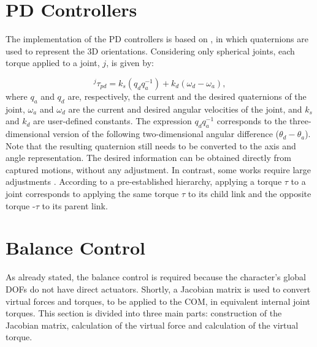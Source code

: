 \documentclass[tog]{acmsiggraph}
\begin{document}

\section{PD Controllers}

The implementation of the PD controllers is based on \cite{bib:NunesTese12}, in which quaternions are used to represent the 3D orientations. 
Considering only spherical joints, each torque applied to a joint, $j$, is given by:

%
\begin{equation}
 ^{j}\tau_{pd} = k_{s}(q_{d}  q_{a}^{-1}) + k_{d}(\omega_{d} -\omega_{a}),
 \label{eq:toquepd3d}
\end{equation}
%
\noindent 
where $q_{a}$ and $q_{d}$ are, respectively, the current and the desired quaternions of the joint, $\omega_{a}$ and $\omega_{d}$ are the current 
and desired angular velocities of the joint, and $k_{s}$ and $k_{d}$ are user-defined constants. The expression  $q_{d}  q_{a}^{-1}$ corresponds to the 
three-dimensional version of the following two-dimensional angular difference ($\theta_d - \theta_a$). Note that the resulting quaternion still
needs to be converted to the axis and angle representation. The desired information can be obtained directly from captured motions, without any
adjustment. In contrast, some works require large adjustments \cite{bib:Yin07}. According to a pre-established hierarchy, applying a torque $\tau$ to a joint corresponds
to applying the same torque $\tau$ to its child link and the opposite torque -$\tau$ to its parent link.




\section{Balance Control}

As already stated, the balance control is required because the character's global DOFs do not have direct actuators.
Shortly, a Jacobian matrix is used to convert virtual forces and torques, to be applied to the COM, in equivalent internal joint torques.
This section is divided into three main parts: construction of the Jacobian matrix, calculation of the virtual force and
calculation of the virtual torque.

\end{document}
